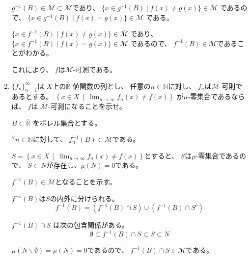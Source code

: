 \documentclass[12pt,b5paper]{ltjsarticle}
\begin{document}
\begin{enumerate}
      $g^{-1}(B)\in\mathcal{M} \subset \overline{\mathcal{M}}$であり、
      $\{ x\in g^{-1}(B) \mid f(x)\ne g(x) \}\in\overline{\mathcal{M}}$
      であるので、
      $\{ x\in g^{-1}(B) \mid f(x)= g(x) \}\in\overline{\mathcal{M}}$
      である。

      $\{ x\in f^{-1}(B) \mid f(x)\ne g(x) \} \in \overline{\mathcal{M}}$
      であり、
      $\{ x\in f^{-1}(B) \mid f(x)= g(x) \}\in\overline{\mathcal{M}}$
      であるので、
      $f^{-1}(B)\in\overline{\mathcal{M}}$であることがわかる。

      これにより、
      $f$は$\overline{\mathcal{M}}$-可測である。


      \hrulefill

 \item
      $\{ f_{n} \}_{n=1}^{\infty}$は
      $X$上の$\overline{\mathbb{R}}$-値関数の列とし、
      任意の$n\in\mathbb{N}$に対し、
      $f_{n}$は$\mathcal{M}$-可則であるとする。
      $\displaystyle \left\{ x\in X \:\middle|\: \lim_{n\to\infty}f_{n}(x) \ne f(x) \right\}$
      が$\mu$-零集合であるならば、
      $f$は
      $\overline{\mathcal{M}}$-可測になることを示せ。

      \dotfill

      $B\subset \overline{\mathbb{R}}$
      をボレル集合とする。

      ${}^{\forall}n\in\mathbb{N}$に対して、
      $f_{n}^{-1}(B)\in\mathcal{M}$である。

      $\displaystyle
      S= \left\{ x\in X \:\middle|\:
      \lim_{n\to\infty}f_{n}(x) \ne f(x) \right\}$とすると、
      $S$は$\mu$-零集合であるので、
      $S\subset N$が存在し、$\mu(N)=0$である。


      $f^{-1}(B)\in\overline{\mathcal{M}}$となることを示す。

      $f^{-1}(B)$は$S$の内外に分けられる。
      \begin{equation}
       f^{-1}(B) = (f^{-1}(B) \cap S) \cup (f^{-1}(B)\cap S^{c})
      \end{equation}

      $f^{-1}(B) \cap S$
      は次の包含関係がある。
      \begin{equation}
       \emptyset \subset f^{-1}(B) \cap S \subset S \subset N
      \end{equation}

      $\mu(N\backslash \emptyset) = \mu(N) =0$であるので、
      $f^{-1}(B) \cap S \in \overline{\mathcal{M}}$である。




\end{enumerate}
\end{document}
